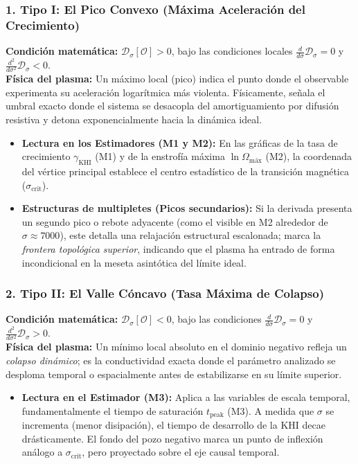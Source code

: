 \subsubsection*{1. Tipo I: El Pico Convexo (Máxima Aceleración del Crecimiento)}
\textbf{Condición matemática:} $\mathcal{D}_\sigma[\mathcal{O}] > 0$, bajo las condiciones locales $\frac{d}{d\sigma} \mathcal{D}_\sigma = 0$ y $\frac{d^2}{d\sigma^2} \mathcal{D}_\sigma < 0$.\\
\textbf{Física del plasma:} Un máximo local (pico) indica el punto donde el observable experimenta su aceleración logarítmica más violenta. Físicamente, señala el umbral exacto donde el sistema se desacopla del amortiguamiento por difusión resistiva y detona exponencialmente hacia la dinámica ideal. 
\begin{itemize}
    \item \textbf{Lectura en los Estimadores (M1 y M2):} En las gráficas de la tasa de crecimiento $\gamma_{\text{KHI}}$ (M1) y de la enstrofía máxima $\ln \Omega_{\text{máx}}$ (M2), la coordenada del vértice principal establece el centro estadístico de la transición magnética ($\sigma_{\text{crit}}$).
    \item \textbf{Estructuras de multipletes (Picos secundarios):} Si la derivada presenta un segundo pico o rebote adyacente (como el visible en M2 alrededor de $\sigma \approx 7000$), este detalla una relajación estructural escalonada; marca la \emph{frontera topológica superior}, indicando que el plasma ha entrado de forma incondicional en la meseta asintótica del límite ideal.
\end{itemize}

\subsubsection*{2. Tipo II: El Valle Cóncavo (Tasa Máxima de Colapso)}
\textbf{Condición matemática:} $\mathcal{D}_\sigma[\mathcal{O}] < 0$, bajo las condiciones $\frac{d}{d\sigma} \mathcal{D}_\sigma = 0$ y $\frac{d^2}{d\sigma^2} \mathcal{D}_\sigma > 0$.\\
\textbf{Física del plasma:} Un mínimo local absoluto en el dominio negativo refleja un \emph{colapso dinámico}; es la conductividad exacta donde el parámetro analizado se desploma temporal o espacialmente antes de estabilizarse en su límite superior.
\begin{itemize}
    \item \textbf{Lectura en el Estimador (M3):} Aplica a las variables de escala temporal, fundamentalmente el tiempo de saturación $t_{\text{peak}}$ (M3). A medida que $\sigma$ se incrementa (menor disipación), el tiempo de desarrollo de la KHI decae drásticamente. El fondo del pozo negativo marca un punto de inflexión análogo a $\sigma_{\text{crit}}$, pero proyectado sobre el eje causal temporal.
\end{itemize}

